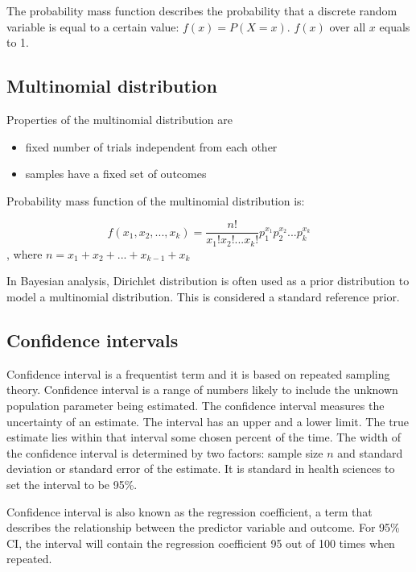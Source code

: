 The probability mass function describes the probability that a discrete random variable is equal to a certain value: $f(x) = P(X = x)$. $f(x)$ over all $x$ equals to 1.\cite{pmf}

\subsection{Multinomial distribution}\label{MultinomialDistribution}

Properties of the multinomial distribution are 
\begin{itemize}
    \item fixed number of trials independent from each other
    \item samples have a fixed set of outcomes
\end{itemize}

Probability mass function of the multinomial distribution is:

\begin{equation}
f(x_1, x_2, ..., x_k) = \frac{n!}{x_1!x_2!...x_k!}p_1^{x_1}p_2^{x_2}...p_k^{x_k}
\end{equation}, where $n = x_1 + x_2 + ... + x_{k-1} + x_k$\cite{multinomialDistribution}\cite{SINHARAY201098}

In Bayesian analysis, Dirichlet distribution is often used as a prior distribution to model a multinomial distribution. \cite{SINHARAY201098} This is considered a standard reference prior.\cite{Pirikahu2016BayesianMO}

\subsection{Confidence intervals}\label{ConfidenceIntervals}

Confidence interval is a frequentist term and it is based on repeated sampling theory.\cite{Schoot2014BayesianA} Confidence interval is a range of numbers likely to include the unknown population parameter being estimated.\cite{Illowsky2013IntroductorySO} The confidence interval measures the uncertainty of an estimate. The interval has an upper and a lower limit. The true estimate lies within that interval some chosen percent of the time. The width of the confidence interval is determined by two factors: sample size $n$ and standard deviation or standard error of the estimate. It is standard in health sciences to set the interval to be 95\%.\cite{Hespanhol2019UnderstandingAI}

Confidence interval is also known as the regression coefficient, a term that describes the relationship between the predictor variable and outcome.\cite{RegressionCoefficients} For 95\% CI, the interval will contain the regression coefficient 95 out of 100 times when repeated.\cite{Schoot2014BayesianA} 

